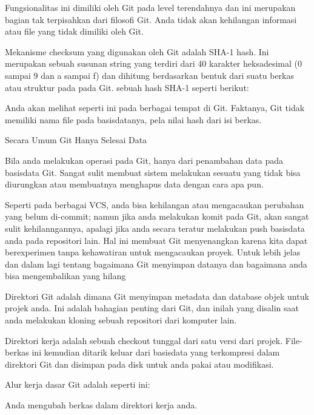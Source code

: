 \noindent 
Fungsionalitas ini dimiliki oleh Git pada level terendahnya dan ini merupakan bagian tak terpisahkan dari filosofi Git. Anda tidak akan kehilangan informasi atau file yang tidak dimiliki oleh Git. \par
\noindent 
 \hspace*{0.5in} Mekanisme checksum yang digunakan oleh Git adalah SHA-1 hash. Ini merupakan sebuah susunan string yang terdiri dari 40 karakter heksadesimal (0 sampai 9 dan a sampai f) dan dihitung berdasarkan bentuk dari suatu berkas atau struktur pada pada Git. sebuah hash SHA-1 seperti berikut: \par
\noindent 
Anda akan melihat seperti ini pada berbagai tempat di Git. Faktanya, Git tidak memiliki nama file pada basisdatanya, pela nilai hash dari isi berkas. \par
\noindent 
Secara Umum Git Hanya Selesai Data \par
\noindent 
Bila anda melakukan operasi pada Git, hanya dari penambahan data pada basisdata Git. Sangat sulit membuat sistem melakukan sesuatu yang tidak bisa diurungkan atau membuatnya menghapus data dengan cara apa pun.  \par
\noindent 
Seperti pada berbagai VCS, anda bisa kehilangan atau mengacaukan perubahan yang belum di-commit; namun jika anda melakukan komit pada Git, akan sangat sulit kehilanngannya, apalagi jika anda secara teratur melakukan push basisdata anda pada repositori lain. Hal ini membuat Git menyenangkan karena kita dapat berexperimen tanpa kehawatiran untuk mengacaukan proyek. Untuk lebih jelas dan dalam lagi tentang bagaimana Git menyimpan datanya dan bagaimana anda bisa mengembalikan yang hilang \par
\noindent 
Direktori Git adalah dimana Git menyimpan metadata dan database objek untuk projek anda. Ini adalah bahagian penting dari Git, dan inilah yang disalin saat anda melakukan kloning sebuah repositori dari komputer lain. \par
\noindent 
Direktori kerja adalah sebuah checkout tunggal dari satu versi dari projek. File-berkas ini kemudian ditarik keluar dari basisdata yang terkompresi dalam direktori Git dan disimpan pada disk untuk anda pakai atau modifikasi. \par
\noindent 
 \hspace*{0.5in} Alur kerja dasar Git adalah seperti ini: \par
\noindent 
 \hspace*{0.5in} Anda mengubah berkas dalam direktori kerja anda. \par
